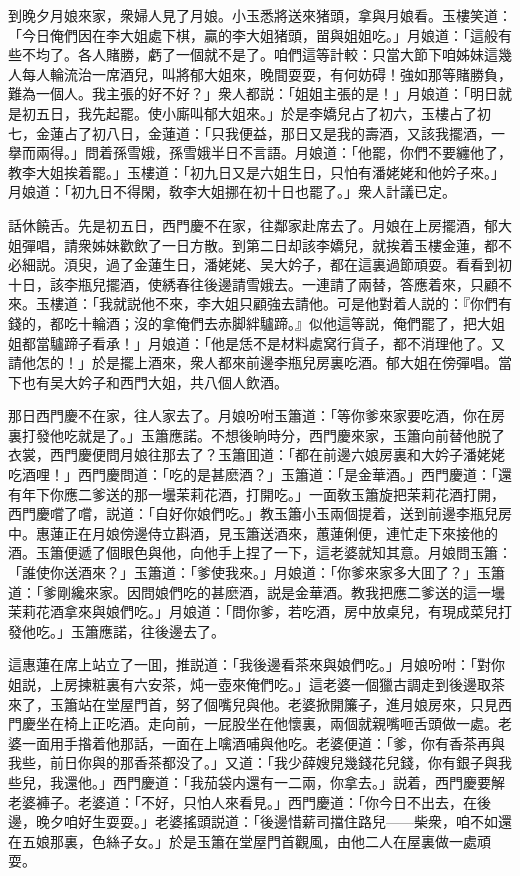 到晚夕月娘來家，衆婦人見了月娘。小玉悉將送來猪頭，拿與月娘看。玉樓笑道：「今日俺們因在李大姐處下棋，贏的李大姐猪頭，㽞與姐姐吃。」月娘道：「這般有些不均了。各人賭勝，虧了一個就不是了。咱們這等計較：只當大節下咱姊妹這幾人每人輪流治一席酒兒，叫將郁大姐來，晚間耍耍，有何妨碍！強如那等賭勝負，難為一個人。我主張的好不好？」衆人都説：「姐姐主張的是！」月娘道：「明日就是初五日，我先起罷。使小廝叫郁大姐來。」於是李嬌兒占了初六，玉樓占了初七，金蓮占了初八日，金蓮道：「只我便益，那日又是我的壽酒，又該我擺酒，一擧而兩得。」問着孫雪娥，孫雪娥半日不言語。月娘道：「他罷，你們不要纏他了，教李大姐挨着罷。」玉樓道：「初九日又是六姐生日，只怕有潘姥姥和他妗子來。」月娘道：「初九日不得閑，敎李大姐挪在初十日也罷了。」衆人計議已定。

話休饒舌。先是初五日，西門慶不在家，往鄰家赴席去了。月娘在上房擺酒，郁大姐彈唱，請衆姊妹歡飲了一日方散。到第二日却該李嬌兒，就挨着玉樓金蓮，都不必細説。湏臾，過了金蓮生日，潘姥姥、吴大妗子，都在這裏過節頑耍。看看到初十日，該李瓶兒擺酒，使綉春往後邊請雪娥去。一連請了兩替，答應着來，只顧不來。玉樓道：「我就説他不來，李大姐只顧強去請他。可是他對着人説的：『你們有錢的，都吃十輪酒；沒的拿俺們去赤脚絆驢蹄。』似他這等説，俺們罷了，把大姐姐都當驢蹄子看承！」月娘道：「他是恁不是材料處窝行貨子，都不消理他了。又請他怎的！」於是擺上酒來，衆人都來前邊李瓶兒房裏吃酒。郁大姐在傍彈唱。當下也有吴大妗子和西門大姐，共八個人飲酒。

那日西門慶不在家，往人家去了。月娘吩咐玉簫道：「等你爹來家要吃酒，你在房裏打發他吃就是了。」玉簫應諾。不想後晌時分，西門慶來家，玉簫向前替他脱了衣裳，西門慶便問月娘往那去了？玉簫囬道：「都在前邊六娘房裏和大妗子潘姥姥吃酒哩！」西門慶問道：「吃的是甚麽酒？」玉簫道：「是金華酒。」西門慶道：「還有年下你應二爹送的那一壜茉莉花酒，打開吃。」一面敎玉簫旋把茉莉花酒打開，西門慶嚐了嚐，説道：「自好你娘們吃。」教玉簫小玉兩個提着，送到前邊李瓶兒房中。惠蓮正在月娘傍邊侍立斟酒，見玉簫送酒來，蕙蓮俐便，連忙走下來接他的酒。玉簫便遞了個眼色與他，向他手上捏了一下，這老婆就知其意。月娘問玉簫：「誰使你送酒來？」玉簫道：「爹使我來。」月娘道：「你爹來家多大囬了？」玉簫道：「爹剛纔來家。因問娘們吃的甚麽酒，説是金華酒。教我把應二爹送的這一壜茉莉花酒拿來與娘們吃。」月娘道：「問你爹，若吃酒，房中放桌兒，有現成菜兒打發他吃。」玉簫應諾，往後邊去了。

這惠蓮在席上站立了一囬，推説道：「我後邊看茶來與娘們吃。」月娘吩咐：「對你姐説，上房揀粧裏有六安茶，炖一壺來俺們吃。」這老婆一個獵古調走到後邊取茶來了，玉簫站在堂屋門首，努了個嘴兒與他。老婆掀開簾子，進月娘房來，只見西門慶坐在椅上正吃酒。走向前，一屁股坐在他懷裏，兩個就親嘴咂舌頭做一處。老婆一面用手揝着他那話，一面在上噙酒哺與他吃。老婆便道：「爹，你有香茶再與我些，前日你與的那香茶都没了。」又道：「我少薛嫂兒幾錢花兒錢，你有銀子與我些兒，我還他。」西門慶道：「我茄袋内還有一二兩，你拿去。」説着，西門慶要解老婆褲子。老婆道：「不好，只怕人來看見。」西門慶道：「你今日不出去，在後邊，晚夕咱好生耍耍。」老婆搖頭説道：「後邊惜薪司擋住路兒——柴衆，咱不如還在五娘那裏，色絲子女。」於是玉簫在堂屋門首觀風，由他二人在屋裏做一處頑耍。


